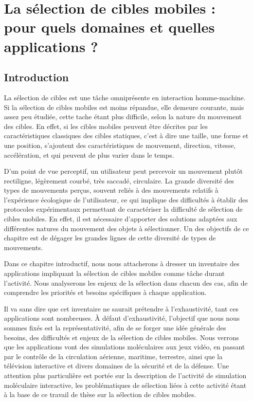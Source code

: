 
\chapter[La sélection de cibles mobiles : pour quels domaines et quelles applications ?]{La sélection de cibles mobiles : pour quels domaines et quelles applications ?}

\setcounter{minitocdepth}{4}
\minitoc
\label{chap1}
\cleardoublepage

	\section{Introduction}
	La sélection de cibles est une tâche omniprésente en interaction homme-machine. Si la sélection de cibles mobiles est moins répandue, elle demeure courante, mais assez peu étudiée, cette tache étant plus difficile, selon la nature du mouvement des cibles. En effet, si les cibles mobiles peuvent être décrites par les caractéristiques classiques des cibles statiques, c'est à dire une taille, une forme et une position, s'ajoutent des caractéristiques de mouvement, direction, vitesse,  accélération, et qui peuvent de plus varier dans le temps. 
	
	D'un point de vue perceptif, un utilisateur peut percevoir un mouvement plutôt rectiligne, légèrement courbé, très saccadé, circulaire. La grande diversité des types de mouvements perçus, souvent reliés à des mouvements relatifs à l'expérience écologique de l'utilisateur, ce qui implique des difficultés à établir  des protocoles expérimentaux permettant de caractériser la difficulté de sélection de cibles mobiles. En effet, il est nécessaire d'apporter des solutions  adaptées aux différentes natures du mouvement des objets à sélectionner. Un des objectifs de ce chapitre est de dégager les grandes lignes de cette diversité de types de mouvements.
	
	Dans ce chapitre introductif, nous nous attacherons à dresser un inventaire des applications impliquant la sélection de cibles mobiles comme tâche durant l'activité. Nous analyserons les enjeux de la sélection dans chacun des cas, afin de comprendre les priorités et besoins spécifiques à chaque application.
	
	Il va sans dire que cet inventaire ne saurait prétendre à l'exhaustivité, tant ces applications sont nombreuses. À défaut d'exhaustivité, l'objectif que nous nous sommes fixés est la représentativité, afin de se forger une idée générale des besoins, des difficultés et enjeux de la sélection de cibles mobiles. Nous verrons que les applications vont des simulations moléculaires aux jeux vidéo, en passant par le contrôle de la circulation aérienne, maritime, terrestre, ainsi que la télévision interactive et divers domaines de la sécurité et de la défense. Une attention plus particulière est portée sur la description de l'activité de simulation moléculaire interactive, les problématiques de sélection liées à cette activité étant à la base de ce travail de thèse sur la sélection de cibles mobiles.
	

